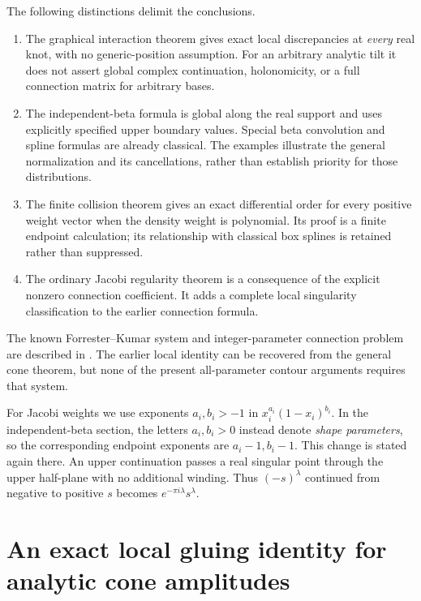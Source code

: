 \documentclass[11pt,a4paper]{article}
\theoremstyle{definition}
\theoremstyle{remark}
\numberwithin{equation}{section}
\begin{document}
The following distinctions delimit the conclusions.
\begin{enumerate}[leftmargin=*,itemsep=4pt]
\item The graphical interaction theorem gives exact local discrepancies
at \emph{every} real knot, with no generic-position assumption. For an
arbitrary analytic tilt it does not assert global complex continuation,
holonomicity, or a full connection matrix for arbitrary bases.
\item The independent-beta formula is global along the real support and
uses explicitly specified upper boundary values. Special beta convolution
and spline formulas are already classical. The examples illustrate the
general normalization and its cancellations, rather than establish
priority for those distributions.
\item The finite collision theorem gives an exact differential order for
every positive weight vector when the density weight is polynomial.
Its proof is a finite endpoint calculation; its relationship with
classical box splines is retained rather than suppressed.
\item The ordinary Jacobi regularity theorem is a consequence of the
explicit nonzero connection coefficient. It adds a complete local
singularity classification to the earlier connection formula.
\end{enumerate}
The known Forrester--Kumar system and integer-parameter connection
problem are described in \cite{p8:SFB_FK}. The earlier local identity can be
recovered from the general cone theorem, but none of the present
all-parameter contour arguments requires that system.

For Jacobi weights we use exponents $a_i,b_i>-1$ in
$x_i^{a_i}(1-x_i)^{b_i}$. In the independent-beta section, the letters
$a_i,b_i>0$ instead denote \emph{shape parameters}, so the corresponding
endpoint exponents are $a_i-1,b_i-1$. This change is stated again there.
An upper continuation passes a real singular point through the upper
half-plane with no additional winding. Thus $(-s)^\lambda$ continued
from negative to positive $s$ becomes $e^{-\pi i\lambda}s^\lambda$.



\section{An exact local gluing identity for analytic cone amplitudes}
\label{p9:acg:section}
\end{document}
